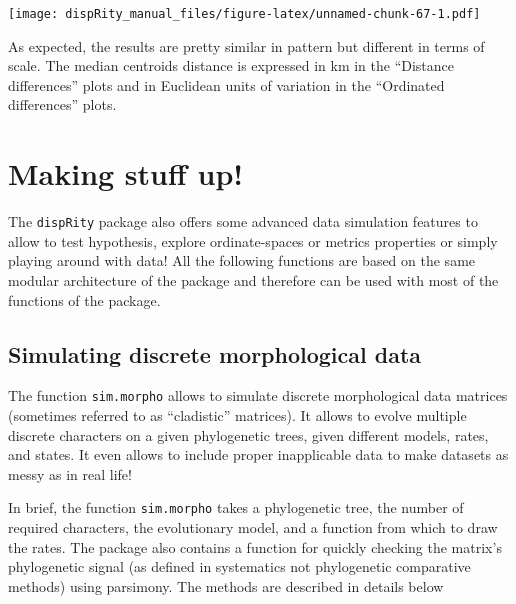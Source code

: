 \documentclass[]{book}
\theoremstyle{definition}
\theoremstyle{definition}
\theoremstyle{remark}
\begin{document}
\texttt{[image: dispRity\_manual\_files/figure-latex/unnamed-chunk-67-1.pdf]}

As expected, the results are pretty similar in pattern but different in
terms of scale. The median centroids distance is expressed in km in the
``Distance differences'' plots and in Euclidean units of variation in
the ``Ordinated differences'' plots.

\chapter{Making stuff up!}\label{making-stuff-up}

The \texttt{dispRity} package also offers some advanced data simulation
features to allow to test hypothesis, explore ordinate-spaces or metrics
properties or simply playing around with data! All the following
functions are based on the same modular architecture of the package and
therefore can be used with most of the functions of the package.

\section{Simulating discrete morphological
data}\label{simulating-discrete-morphological-data}

The function \texttt{sim.morpho} allows to simulate discrete
morphological data matrices (sometimes referred to as ``cladistic''
matrices). It allows to evolve multiple discrete characters on a given
phylogenetic trees, given different models, rates, and states. It even
allows to include proper inapplicable data to make datasets as messy as
in real life!

In brief, the function \texttt{sim.morpho} takes a phylogenetic tree,
the number of required characters, the evolutionary model, and a
function from which to draw the rates. The package also contains a
function for quickly checking the matrix's phylogenetic signal (as
defined in systematics not phylogenetic comparative methods) using
parsimony. The methods are described in details below
\end{document}
